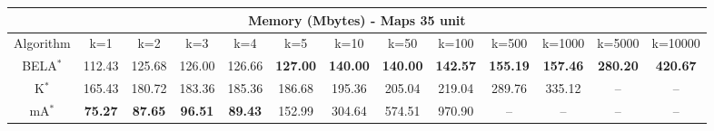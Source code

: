 \begin{tabular}{c|cccccccccccc}\toprule
\multicolumn{13}{c}{Memory (Mbytes) - Maps 35 unit}\\ \midrule
Algorithm & k=1 & k=2 & k=3 & k=4 & k=5 & k=10 & k=50 & k=100 & k=500 & k=1000 & k=5000 & k=10000 \\ \midrule
BELA$^*$ & 112.43 & 125.68 & 126.00 & 126.66 & \textbf{127.00} & \textbf{140.00} & \textbf{140.00} & \textbf{142.57} & \textbf{155.19} & \textbf{157.46} & \textbf{280.20} & \textbf{420.67} \\
K$^*$ & 165.43 & 180.72 & 183.36 & 185.36 & 186.68 & 195.36 & 205.04 & 219.04 & 289.76 & 335.12 & -- & -- \\
mA$^*$ & \textbf{75.27} & \textbf{87.65} & \textbf{96.51} & \textbf{89.43} & 152.99 & 304.64 & 574.51 & 970.90 & -- & -- & -- & -- \\ \bottomrule 
\end{tabular}
